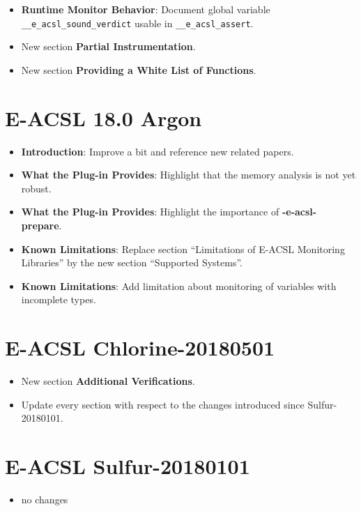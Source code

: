 \begin{itemize}
\item \textbf{Runtime Monitor Behavior}: Document global variable
  \texttt{\_\_e\_acsl\_sound\_verdict} usable in \texttt{\_\_e\_acsl\_assert}.
\item New section \textbf{Partial Instrumentation}.
\item New section \textbf{Providing a White List of Functions}.
\end{itemize}

\section*{E-ACSL 18.0 Argon}

\begin{itemize}
\item \textbf{Introduction}: Improve a bit and reference new related papers.
\item \textbf{What the Plug-in Provides}: Highlight that the memory analysis is
  not yet robust.
\item \textbf{What the Plug-in Provides}: Highlight the importance of
  \textbf{-e-acsl-prepare}.
\item \textbf{Known Limitations}: Replace section ``Limitations of E-ACSL
  Monitoring Libraries'' by the new section ``Supported Systems''.
\item \textbf{Known Limitations}: Add limitation about monitoring of variables
  with incomplete types.
\end{itemize}

\section*{E-ACSL Chlorine-20180501}

\begin{itemize}
\item New section \textbf{Additional Verifications}.
\item Update every section with respect to the changes introduced since \eacsl
  Sulfur-20180101.
\end{itemize}

\section*{E-ACSL Sulfur-20180101}

\begin{itemize}
\item no changes
\end{itemize}

